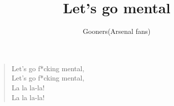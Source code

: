 \documentclass[a4paper,12pt]{article}
\title{Let's go mental}
\author{Gooners(Arsenal fans)}
\date{}
\begin{document}
	
	\maketitle
	
	\begin{verse}
		
		Let's go f*cking mental, \\
		Let's go f*cking mental, \\
		La la la-la! \\
		La la la-la!
		
	\end{verse}
	
\end{document}
